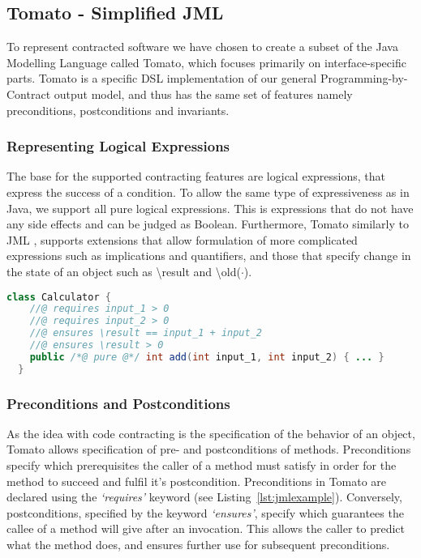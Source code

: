 \subsection{Tomato - Simplified JML}
\label{sub:Tomato-SimplifiedJML}

To represent contracted software we have chosen to create a subset of the
Java Modelling Language called Tomato,
which focuses primarily on interface-specific parts. 
Tomato is a specific DSL implementation of our general Programming-by-Contract output model, and thus has the same set of features
namely preconditions, postconditions and invariants.

\subsubsection{Representing Logical Expressions}
\label{sub:Representing Logical Expressions}
The base for the supported contracting features are logical expressions, that express
the success of a condition.
To allow the same type of expressiveness as in Java, we support all pure
logical expressions. This is expressions that do not have any side effects and can be judged as Boolean.
Furthermore, Tomato similarly to JML \cite{leavens2006design},
supports extensions that allow formulation of more complicated
expressions such as implications and quantifiers,
and those that specify change in the state of an object such as \textbackslash result
and \textbackslash old($\cdot$).

\begin{lstlisting}[language=Java,caption={Contracted Method for Adding Natural Numbers},label={lst:jmlexample}]
  class Calculator {
    //@ requires input_1 > 0
    //@ requires input_2 > 0
    //@ ensures \result == input_1 + input_2
    //@ ensures \result > 0
    public /*@ pure @*/ int add(int input_1, int input_2) { ... }
  }
\end{lstlisting}

\subsubsection{Preconditions and Postconditions}
\label{sub:Preconditions and Postconditions}

As the idea with code contracting is the specification of the behavior of
an object, Tomato allows specification of pre- and postconditions of methods.
Preconditions specify which prerequisites the caller of a method must
satisfy in order for the method to succeed and fulfil it's postcondition.
Preconditions in Tomato are declared using the \emph{`requires'}
keyword (see Listing~\ref{lst:jmlexample}).
Conversely, postconditions, specified by the keyword \emph{`ensures'},
specify which guarantees the callee of a method will give after an invocation.
This allows the caller to predict what the method does,
and ensures further use for subsequent preconditions.

